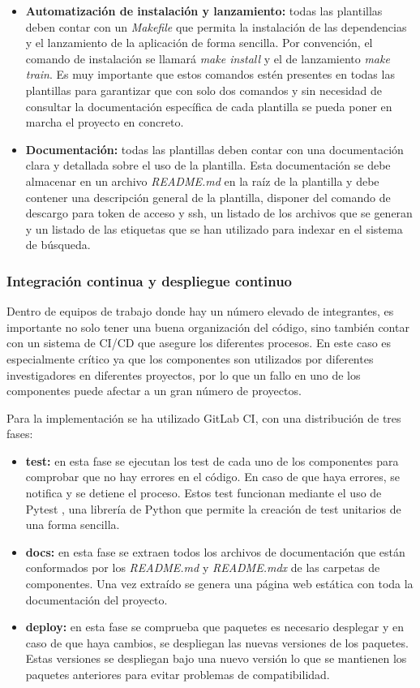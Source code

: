\begin{itemize}
    \item \textbf{Automatización de instalación y lanzamiento:} todas las plantillas
    deben contar con un \textit{Makefile} que permita la instalación de las dependencias y
    el lanzamiento de la aplicación de forma sencilla. Por convención, el comando
    de instalación se llamará \textit{make install} y el de lanzamiento \textit{make train}.
    Es muy importante que estos comandos estén presentes en todas las plantillas para
    garantizar que con solo dos comandos y sin necesidad de consultar la documentación
    específica de cada plantilla se pueda poner en marcha el proyecto en concreto.
    \item \textbf{Documentación:} todas las plantillas deben contar con una documentación
    clara y detallada sobre el uso de la plantilla. Esta documentación se debe almacenar
    en un archivo \textit{README.md} en la raíz de la plantilla y debe contener una descripción
    general de la plantilla, disponer del comando de descargo para token de acceso y ssh,
    un listado de los archivos que se generan y un listado de las etiquetas que se han
    utilizado para indexar en el sistema de búsqueda.
\end{itemize}

\subsubsection{Integración continua y despliegue continuo}
Dentro de equipos de trabajo donde hay un número elevado de integrantes, es
importante no solo tener una buena organización del código, sino también
contar con un sistema de CI/CD que asegure los diferentes procesos. En este
caso es especialmente crítico ya que los componentes son utilizados por
diferentes investigadores en diferentes proyectos, por lo que un fallo en uno de
los componentes puede afectar a un gran número de proyectos.\medskip

Para la implementación se ha utilizado GitLab CI, con una distribución de 
tres fases: 
\begin{itemize}
    \item \textbf{test:} en esta fase se ejecutan los test de cada uno de los componentes
    para comprobar que no hay errores en el código. En caso de que haya errores, se
    notifica y se detiene el proceso. Estos test funcionan mediante el uso de Pytest \cite{Pytest},
    una librería de Python que permite la creación de test unitarios de una forma sencilla.
    \item \textbf{docs:} en esta fase se extraen todos los archivos de documentación que están 
    conformados por los \textit{README.md} y \textit{README.mdx} de las carpetas de componentes. 
    Una vez extraído se genera una página web estática con toda la documentación del proyecto.
    \item \textbf{deploy:} en esta fase se comprueba que paquetes es necesario desplegar y en caso
    de que haya cambios, se despliegan las nuevas versiones de los paquetes. Estas versiones se despliegan
    bajo una nuevo versión lo que se mantienen los paquetes anteriores para evitar problemas de compatibilidad.
\end{itemize}



